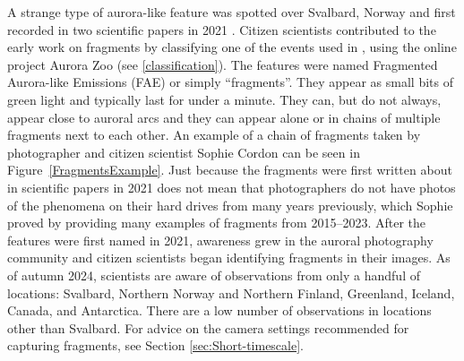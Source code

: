 \documentclass{article}
\renewcommand{\cite}[1]{\parencite{#1}}
\begin{document}
A strange type of aurora-like feature was spotted over Svalbard, Norway and first recorded in two scientific papers in 2021 \cite{Dreyer2021, Whiter2021}. Citizen scientists contributed to the early work on fragments by classifying one of the events used in \textcite{Whiter2021}, using the online project Aurora Zoo (see \ref{classification}). The features were named Fragmented Aurora-like Emissions (FAE) or simply ``fragments''. They appear as small bits of green light and typically last for under a minute. They can, but do not always, appear close to auroral arcs and they can appear alone or in chains of multiple fragments next to each other. An example of a chain of fragments taken by photographer and citizen scientist Sophie Cordon can be seen in Figure~\ref{FragmentsExample}. Just because the fragments were first written about in scientific papers in 2021 does not mean that photographers do not have photos of the phenomena on their hard drives from many years previously, which Sophie proved by providing many examples of fragments from 2015--2023.  After the features were first named in 2021, awareness grew in the auroral photography community and citizen scientists began identifying fragments in their images. As of autumn 2024, scientists are aware of observations from only a handful of locations: Svalbard, Northern Norway and Northern Finland, Greenland, Iceland, Canada, and Antarctica. There are a low number of observations in locations other than Svalbard. For advice on the camera settings recommended for capturing fragments, see Section \ref{sec:Short-timescale}.
\end{document}
